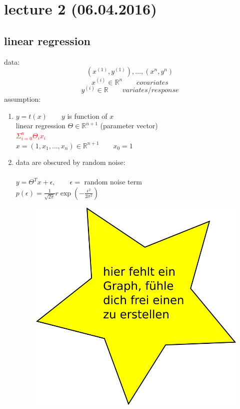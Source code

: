 \section*{lecture 2 (06.04.2016)}
\subsection*{linear regression}
data: \space \[(x^{(1)}, y^{(1)}), \dots , (x^{n}, y^{n})\]
\[x^{(i)} \in \mathbb{R}^n \quad\quad covariates\]
\[y^{(i)} \in \mathbb{R} \quad\quad variates/response \]
assumption:
\begin{enumerate}[(1)]
\item $y = t(x) \quad\quad y$ is function of $x$\\
linear regression \space\space {} \space $\Theta \in \mathbb{R}^{n+1}$ (parameter vector)\\
\textcolor{red}{\quad\quad\quad\quad\quad\quad\quad\quad\quad$\Sigma^n_{i = 0} \Theta_i x_i$}\\
$x= (1,x_1, \dots ,x_n) \in \mathbb{R}^{n+1} \quad \quad x_0 = 1$
\item data are obscured by random noise:\\\\
$y = \Theta^T x +\epsilon, \quad\quad \epsilon = $ random noise term\\
$p(\epsilon) = \frac{1}{\sqrt{2\pi}} r \exp (- \frac{\epsilon^2}{2 \sigma^2})$\\

	\begin{figure}
		\centering
		\includegraphics[width=0.7\linewidth]{graphs/dummy}
	\end{figure}


\end{enumerate}
